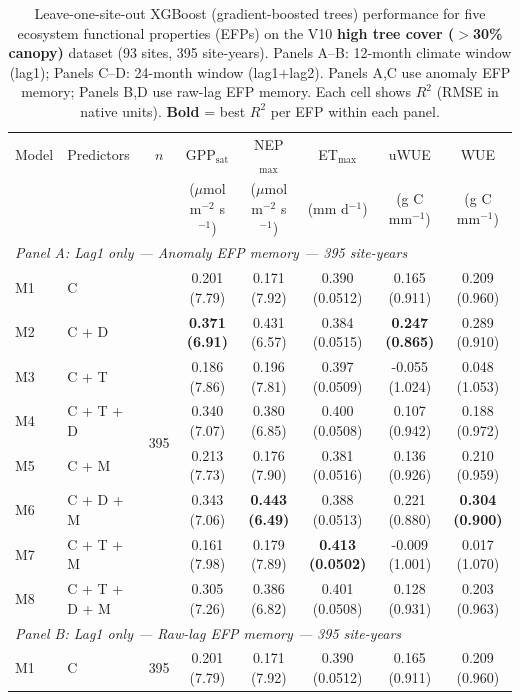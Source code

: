 \begin{table}[htbp]
\centering
\caption{Leave-one-site-out XGBoost (gradient-boosted trees) performance for five ecosystem functional properties (EFPs) on the V10 \textbf{high tree cover ($>$30\% canopy)} dataset (93 sites, 395 site-years). Panels A--B: 12-month climate window (lag1); Panels C--D: 24-month window (lag1+lag2). Panels A,C use anomaly EFP memory; Panels B,D use raw-lag EFP memory. Each cell shows $R^2$ (RMSE in native units). \textbf{Bold} = best $R^2$ per EFP within each panel.}
\label{tab:XGB_LOSO_v10_filtered}
\footnotesize
\setlength{\tabcolsep}{4pt}
\begin{tabular}{llcccccc}
\toprule
Model & Predictors & $n$ & GPP$_\mathrm{sat}$ & NEP$_\mathrm{max}$ & ET$_\mathrm{max}$ & uWUE & WUE \\
  &  &  & ($\mu$mol m$^{-2}$ s$^{-1}$) & ($\mu$mol m$^{-2}$ s$^{-1}$) & (mm d$^{-1}$) & (g C mm$^{-1}$) & (g C mm$^{-1}$) \\
\midrule
\multicolumn{8}{l}{\textit{Panel A: Lag1 only --- Anomaly EFP memory --- 395 site-years}} \\
\midrule
M1 & C & \multirow{8}{*}{395} & 0.201 (7.79) & 0.171 (7.92) & 0.390 (0.0512) & 0.165 (0.911) & 0.209 (0.960) \\
M2 & C + D &  & \textbf{0.371 (6.91)} & 0.431 (6.57) & 0.384 (0.0515) & \textbf{0.247 (0.865)} & 0.289 (0.910) \\
M3 & C + T &  & 0.186 (7.86) & 0.196 (7.81) & 0.397 (0.0509) & -0.055 (1.024) & 0.048 (1.053) \\
M4 & C + T + D &  & 0.340 (7.07) & 0.380 (6.85) & 0.400 (0.0508) & 0.107 (0.942) & 0.188 (0.972) \\
M5 & C + M &  & 0.213 (7.73) & 0.176 (7.90) & 0.381 (0.0516) & 0.136 (0.926) & 0.210 (0.959) \\
M6 & C + D + M &  & 0.343 (7.06) & \textbf{0.443 (6.49)} & 0.388 (0.0513) & 0.221 (0.880) & \textbf{0.304 (0.900)} \\
M7 & C + T + M &  & 0.161 (7.98) & 0.179 (7.89) & \textbf{0.413 (0.0502)} & -0.009 (1.001) & 0.017 (1.070) \\
M8 & C + T + D + M &  & 0.305 (7.26) & 0.386 (6.82) & 0.401 (0.0508) & 0.128 (0.931) & 0.203 (0.963) \\
\midrule
\multicolumn{8}{l}{\textit{Panel B: Lag1 only --- Raw-lag EFP memory --- 395 site-years}} \\
\midrule
M1 & C & \multirow{8}{*}{395} & 0.201 (7.79) & 0.171 (7.92) & 0.390 (0.0512) & 0.165 (0.911) & 0.209 (0.960) \\

\end{tabular}
\end{table}
